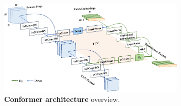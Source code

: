 \begin{figure}[t]
    \centering
    \includegraphics[width=0.8\textwidth]{fig/rel/images/conformer.pdf}
    \caption{\textbf{Conformer architecture} overview. \autocite{peng2021conformer}}
    \label{fig:rel_conformer}
\end{figure}
